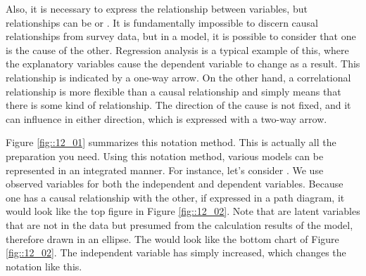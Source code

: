 \documentclass{ltjsbook}
\begin{document}
Also, it is necessary to express the relationship between variables, but relationships can be  or . It is fundamentally impossible to discern causal relationships from survey data, but in a model, it is possible to consider that one is the cause of the other. Regression analysis is a typical example of this, where the explanatory variables cause the dependent variable to change as a result. This relationship is indicated by a one-way arrow. On the other hand, a correlational relationship is more flexible than a causal relationship and simply means that there is some kind of relationship. The direction of the cause is not fixed, and it can influence in either direction, which is expressed with a two-way arrow.



Figure \ref{fig::12_01} summarizes this notation method. This is actually all the preparation you need. Using this notation method, various models can be represented in an integrated manner. For instance, let's consider . We use observed variables for both the independent and dependent variables. Because one has a causal relationship with the other, if expressed in a path diagram, it would look like the top figure in Figure \ref{fig::12_02}. Note that  are latent variables that are not in the data but presumed from the calculation results of the model, therefore drawn in an ellipse. The  would look like the bottom chart of Figure \ref{fig::12_02}. The independent variable has simply increased, which changes the notation like this.
\end{document}
